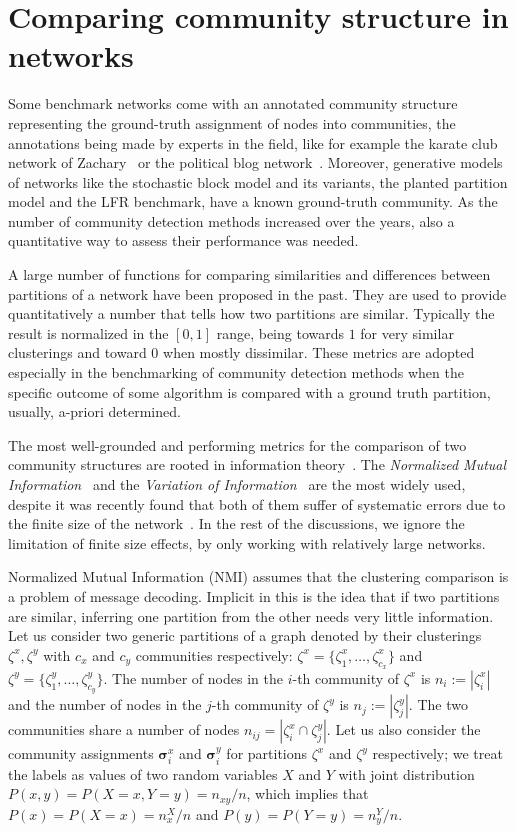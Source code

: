 \documentclass[11pt,              a4paper,              twoside,openright,              titlepage,              headinclude,footinclude,                            numbers=noenddot,              cleardoublepage=empty,]{scrreprt}
\begin{document}
\section{Comparing community structure in networks}
Some benchmark networks come with an annotated community structure representing the ground-truth assignment of nodes into communities, the annotations being made by experts in the field, like for example the karate club network of Zachary~\cite{zachary1977} or the political blog network~\cite{adamic2005}.
Moreover, generative models of networks like the stochastic block model and its variants, the planted partition model and the LFR benchmark, have a known ground-truth community.
As the number of community detection methods increased over the years, also a quantitative way to assess their performance was needed.

A large number of functions for comparing similarities and differences between partitions of a network have been proposed in the past.
They are used to provide quantitatively a number that tells how two partitions are similar.
Typically the result is normalized in the $[0,1]$ range, being towards $1$ for very similar clusterings and toward $0$ when mostly dissimilar.
These metrics are adopted especially in the benchmarking of community detection methods when the specific outcome of some algorithm is compared with a ground truth partition, usually, a-priori determined.

The most well-grounded and performing metrics for the comparison of two community structures are rooted in information theory~\cite{cover2006}.
The \emph{Normalized Mutual Information}~\cite{danon2005} and the \emph{Variation of Information}~\cite{meila2007} are the most widely used, despite it was recently found that both of them suffer of systematic errors due to the finite size of the network~\cite{zhang2015a}.
In the rest of the discussions, we ignore the limitation of finite size effects, by only working with relatively large networks.

Normalized Mutual Information (NMI) assumes that the clustering comparison is a problem of message decoding.
Implicit in this is the idea that if two partitions are similar, inferring one partition from the other needs very little information.
Let us consider two generic partitions of a graph denoted by their clusterings $\zeta^x,\zeta^y$ with $c_x$ and $c_y$ communities respectively: $\zeta^x=\{\zeta^x_1,\ldots,\zeta^x_{c_x}\}$ and $\zeta^y=\{\zeta^y_1,\ldots,\zeta^y_{c_y}\}$.
The number of nodes in the $i$-th community of $\zeta^x$ is $n_i :=|\zeta^x_i|$ and the number of nodes in the $j$-th community of $\zeta^y$ is $n_j:=|\zeta^y_j|$.
The two communities share a number of nodes $n_{ij}=| \zeta^x_i \cap \zeta^y_j|$.
Let us also consider the community assignments $\boldsymbol\sigma^x_i$ and $\boldsymbol\sigma^y_i$ for partitions $\zeta^x$ and $\zeta^y$ respectively; we treat the labels as values of two random variables $X$ and $Y$ with joint distribution $P(x,y)=P(X=x, Y=y) = n_{xy}/n$, which implies that $P(x)=P(X=x)=n_x^X/n$ and $P(y)=P(Y=y)=n_y^Y/n$.
\end{document}
